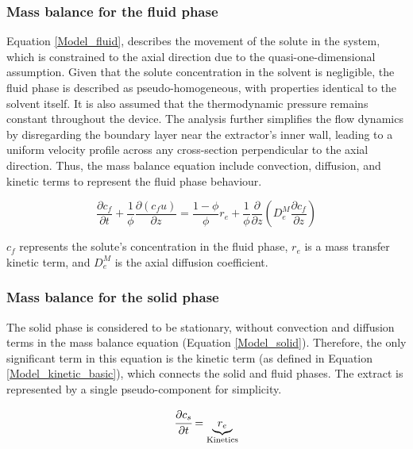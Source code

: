 \documentclass[../Article_Model_Parameters.tex]{subfiles}
\begin{document}
	\subsubsection{Mass balance for the fluid phase} \label{CH: Mass_balance_fluid}
	
	Equation \ref{Model_fluid}, describes the movement of the solute in the system, which is constrained to the axial direction due to the quasi-one-dimensional assumption. Given that the solute concentration in the solvent is negligible, the fluid phase is described as pseudo-homogeneous, with properties identical to the solvent itself. It is also assumed that the thermodynamic pressure remains constant throughout the device. The analysis further simplifies the flow dynamics by disregarding the boundary layer near the extractor's inner wall, leading to a uniform velocity profile across any cross-section perpendicular to the axial direction. Thus, the mass balance equation include convection, diffusion, and kinetic terms to represent the fluid phase behaviour.
	
	{\footnotesize
		\begin{equation}
			\label{Model_fluid}
			\frac{\partial c_f}{\partial t}
			+ \frac{1}{\phi} \frac{\partial \left( c_f u\right)}{\partial z}
			= \frac{1-\phi}{\phi} r_e
			+ \frac{1}{\phi} \frac{\partial}{\partial z} \left( D^M_e \frac{\partial c_f}{\partial z} \right)
		\end{equation}
	}
	
	$c_f$ represents the solute's concentration in the fluid phase, $r_e$ is a mass transfer kinetic term, and $D^M_e$ is the axial diffusion coefficient.
	
	\subsubsection{Mass balance for the solid phase} \label{Mass_balance_solid}
	
	The solid phase is considered to be stationary, without convection and diffusion terms in the mass balance equation (Equation \ref{Model_solid}). Therefore, the only significant term in this equation is the kinetic term (as defined in Equation \ref{Model_kinetic_basic}), which connects the solid and fluid phases. The extract is represented by a single pseudo-component for simplicity. 
	
	{\footnotesize
		\begin{equation} 
			\label{Model_solid}
					\cfrac{\partial c_s}{\partial t} = \underbrace{ r_e }_{\text{Kinetics}}
			\end{equation} }
			
\end{document}
